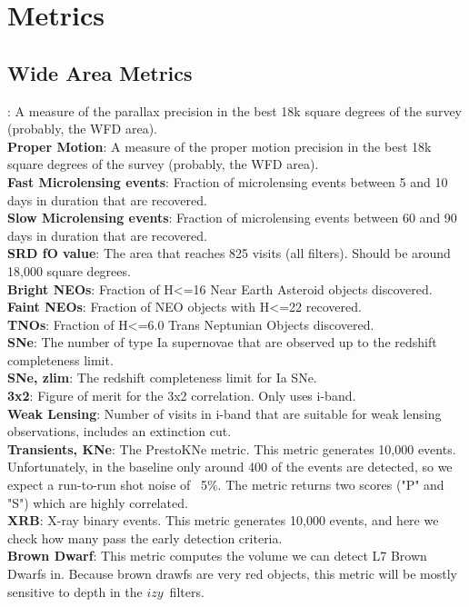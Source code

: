 \section{Metrics}



\subsection{Wide Area Metrics}

: A measure of the parallax precision in the best 18k square degrees of the survey (probably, the WFD area).  \\
{\bf Proper Motion}: A measure of the proper motion precision in the best 18k square degrees of the survey (probably, the WFD area). \\
{\bf Fast Microlensing events}: Fraction of microlensing events between 5 and 10 days in duration that are recovered. \\
{\bf Slow Microlensing events}: Fraction of microlensing events between 60 and 90 days in duration that are recovered.\\
{\bf SRD fO value}: The area that reaches 825 visits (all filters). Should be around 18,000 square degrees. \\
{\bf Bright NEOs}: Fraction of H<=16 Near Earth Asteroid objects discovered. \\
{\bf Faint NEOs}: Fraction of NEO objects with H<=22 recovered.  \\
{\bf TNOs}: Fraction of H<=6.0 Trans Neptunian Objects discovered.  \\
{\bf SNe}: The number of type Ia supernovae that are observed up to the redshift completeness limit. \\
{\bf SNe, zlim}: The redshift completeness limit for Ia SNe. \\
{\bf 3x2}: Figure of merit for the 3x2 correlation. Only uses i-band. \\
{\bf Weak Lensing}: Number of visits in i-band that are suitable for weak lensing observations, includes an extinction cut. \\
{\bf Transients, KNe}: The PrestoKNe metric. This metric generates 10,000 events. Unfortunately, in the baseline only around 400 of the events are detected, so we expect a run-to-run shot noise of ~5\%. The metric returns two scores ("P" and "S") which are highly correlated.  \\
{\bf XRB}: X-ray binary events. This metric generates 10,000 events, and here we check how many pass the early detection criteria. \\
{\bf Brown Dwarf}:  This metric computes the volume we can detect L7 Brown Dwarfs in. Because brown drawfs are very red objects, this metric will be mostly sensitive to depth in the $izy$\ filters.\\

